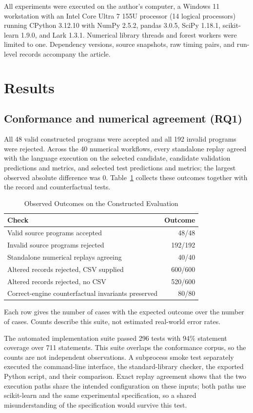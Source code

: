 \documentclass[lettersize,journal]{IEEEtran}
\begin{document}
All experiments were executed on the author's computer, a Windows 11 workstation with an Intel Core Ultra 7 155U processor (14 logical processors) running CPython 3.12.10 with NumPy 2.5.2, pandas 3.0.5, SciPy 1.18.1, scikit-learn 1.9.0, and Lark 1.3.1. Numerical library threads and forest workers were limited to one. Dependency versions, source snapshots, raw timing pairs, and run-level records accompany the article.

\section{Results}
\subsection{Conformance and numerical agreement (RQ1)}
All 48 valid constructed programs were accepted and all 192 invalid programs were rejected. Across the 40 numerical workflows, every standalone replay agreed with the language execution on the selected candidate, candidate validation predictions and metrics, and selected test predictions and metrics; the largest observed absolute difference was 0. Table~\ref{tab:outcomes} collects these outcomes together with the record and counterfactual tests.

\begin{table}[t]
\caption{Observed Outcomes on the Constructed Evaluation}
\label{tab:outcomes}\centering\footnotesize
\begin{tabular}{p{}r}\toprule
Check & Outcome\\\midrule
Valid source programs accepted & 48/48\\
Invalid source programs rejected & 192/192\\
Standalone numerical replays agreeing & 40/40\\
Altered records rejected, CSV supplied & 600/600\\
Altered records rejected, no CSV & 520/600\\
Correct-engine counterfactual invariants preserved & 80/80\\\bottomrule
\end{tabular}

\smallskip
\parbox{0.95\columnwidth}{\footnotesize Each row gives the number of cases with the expected outcome over the number of cases. Counts describe this suite, not estimated real-world error rates.}
\end{table}

The automated implementation suite passed 296 tests with 94\% statement coverage over 711 statements. This suite overlaps the conformance corpus, so the counts are not independent observations. A subprocess smoke test separately executed the command-line interface, the standard-library checker, the exported Python script, and their comparison. Exact replay agreement shows that the two execution paths share the intended configuration on these inputs; both paths use scikit-learn and the same experimental specification, so a shared misunderstanding of the specification would survive this test.
\end{document}
